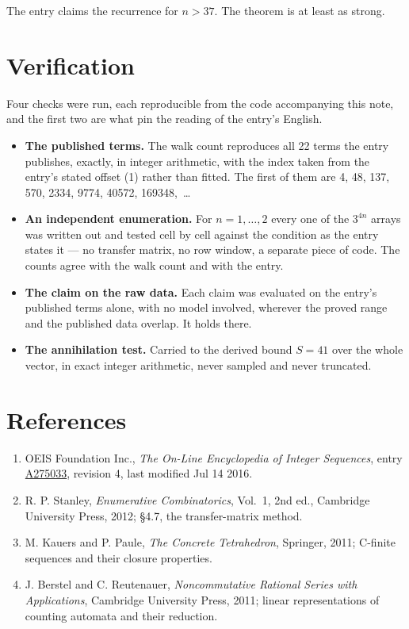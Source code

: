\documentclass[11pt]{article}
\theoremstyle{definition}
\begin{document}
The entry claims the recurrence for $n > 37$. The theorem is at least as strong.

\section{Verification}

Four checks were run, each reproducible from the code accompanying this note, and the first two are what pin the reading of the entry's English.

\begin{itemize}

\item {\bfseries The published terms.} The walk count reproduces all 22 terms the entry publishes, exactly, in integer arithmetic, with the index taken from the entry's stated offset (1) rather than fitted. The first of them are 4, 48, 137, 570, 2334, 9774, 40572, 169348,~\dots

\item {\bfseries An independent enumeration.} For $n = 1,\dots,2$ every one of the $3^{4n}$ arrays was written out and tested cell by cell against the condition as the entry states it --- no transfer matrix, no row window, a separate piece of code. The counts agree with the walk count and with the entry.

\item {\bfseries The claim on the raw data.} Each claim was evaluated on the entry's published terms alone, with no model involved, wherever the proved range and the published data overlap. It holds there.

\item {\bfseries The annihilation test.} Carried to the derived bound $S = 41$ over the whole vector, in exact integer arithmetic, never sampled and never truncated.

\end{itemize}

\section{References}

\begin{enumerate}

\item OEIS Foundation Inc., \emph{The On-Line Encyclopedia of Integer Sequences}, entry \href{https://oeis.org/A275033}{A275033}, revision 4, last modified Jul 14 2016.

\item R. P. Stanley, \emph{Enumerative Combinatorics}, Vol.~1, 2nd ed., Cambridge University Press, 2012; \S4.7, the transfer-matrix method.

\item M. Kauers and P. Paule, \emph{The Concrete Tetrahedron}, Springer, 2011; C-finite sequences and their closure properties.

\item J. Berstel and C. Reutenauer, \emph{Noncommutative Rational Series with Applications}, Cambridge University Press, 2011; linear representations of counting automata and their reduction.

\end{enumerate}
\end{document}
